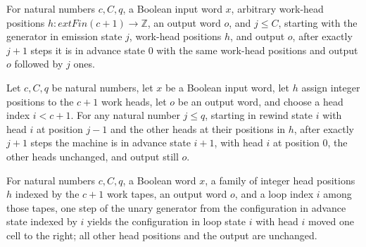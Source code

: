 \begin{lemma}
\label{Turing.FinTM.catalogPoly_emit}
\leanok
{}
For natural numbers $c,C,q$, a Boolean input word $x$, arbitrary work-head positions $h
: 	ext{Fin}(c+1) \to \mathbb{Z}$, an output word $o$, and $j \le C$, starting with the
generator in emission state $j$, work-head positions $h$, and output $o$, after exactly
$j+1$ steps it is in advance state $0$ with the same work-head positions and output $o$
followed by $j$ ones.
\end{lemma}

\begin{lemma}
\label{Turing.FinTM.catalogPoly_rewind}
\leanok
{}
Let $c,C,q$ be natural numbers, let $x$ be a Boolean input word, let $h$ assign integer
positions to the $c+1$ work heads, let $o$ be an output word, and choose a head index
$i<c+1$. For any natural number $j\le q$, starting in rewind state $i$ with head $i$ at
position $j-1$ and the other heads at their positions in $h$, after exactly $j+1$ steps
the machine is in advance state $i+1$, with head $i$ at position $0$, the other heads
unchanged, and output still $o$.
\end{lemma}

\begin{lemma}
\label{Turing.FinTM.catalogPoly_advance}
\leanok
{}
For natural numbers $c,C,q$, a Boolean word $x$, a family of integer head positions $h$
indexed by the $c+1$ work tapes, an output word $o$, and a loop index $i$ among those
tapes, one step of the unary generator from the configuration in advance state indexed
by $i$ yields the configuration in loop state $i$ with head $i$ moved one cell to the
right; all other head positions and the output are unchanged.
\end{lemma}

